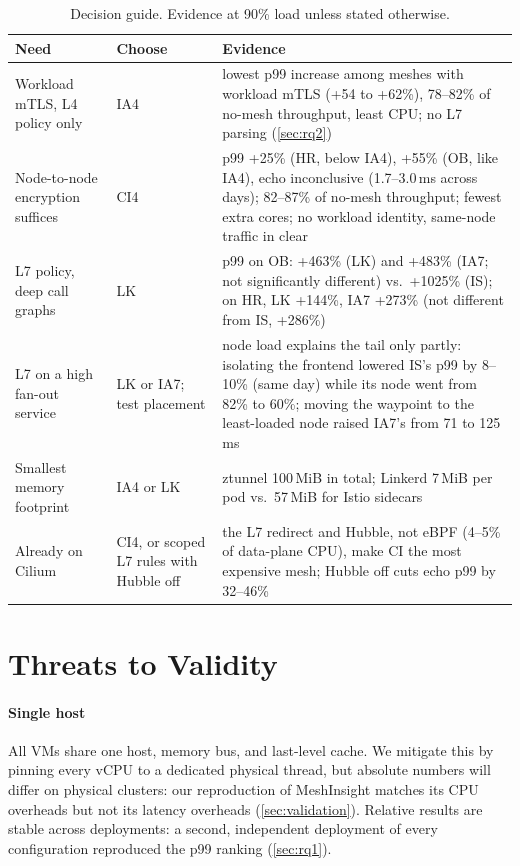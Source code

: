 \begin{table}[t]
  \centering
  \caption{Decision guide. Evidence at 90\% load unless stated otherwise.}
  \label{tab:guide}
  \footnotesize
  \setlength{\tabcolsep}{3pt}
  \begin{tabular}{@{}>{\raggedright\arraybackslash}p{}>{\raggedright\arraybackslash}p{}>{\raggedright\arraybackslash}p{}@{}}
    \toprule
    Need & Choose & Evidence \\
    \midrule
    Workload mTLS, L4 policy only & IA4 & lowest p99 increase among meshes with
      workload mTLS (+54 to +62\%), 78--82\% of no-mesh throughput, least CPU;
      no L7 parsing (\cref{sec:rq2}) \\
    Node-to-node encryption suffices & CI4 & p99 +25\% (HR, below IA4), +55\%
      (OB, like IA4), echo inconclusive (1.7--3.0\,ms across days); 82--87\% of no-mesh throughput; fewest
      extra cores; no workload identity, same-node traffic in clear \\
    L7 policy, deep call graphs & LK & p99 on OB: +463\% (LK) and +483\%
      (IA7; not significantly different) vs.\ +1025\% (IS); on HR, LK +144\%,
      IA7 +273\% (not different from IS, +286\%) \\
    L7 on a high fan-out service & LK or IA7; test placement & node load
      explains the tail only partly: isolating the frontend lowered IS's p99 by
      8--10\% (same day) while its node went from 82\% to 60\%; moving the waypoint to the least-loaded node raised IA7's from 71 to
      125\,ms \\
    Smallest memory footprint & IA4 or LK & ztunnel 100\,MiB in total; Linkerd
      7\,MiB per pod vs.\ 57\,MiB for Istio sidecars \\
    Already on Cilium & CI4, or scoped L7 rules with Hubble off & the L7
      redirect and Hubble, not eBPF (4--5\% of data-plane CPU), make CI the
      most expensive mesh; Hubble off cuts echo p99 by 32--46\% \\
    \bottomrule
  \end{tabular}
\end{table}

\section{Threats to Validity}
\label{sec:threats}

\paragraph{Single host}
All VMs share one host, memory bus, and last-level cache. We mitigate this by
pinning every vCPU to a dedicated physical thread, but absolute numbers will
differ on physical clusters: our reproduction of MeshInsight matches its CPU
overheads but not its latency overheads (\cref{sec:validation}). Relative results are stable across deployments: a second,
independent deployment of every configuration reproduced the p99 ranking
(\cref{sec:rq1}).

